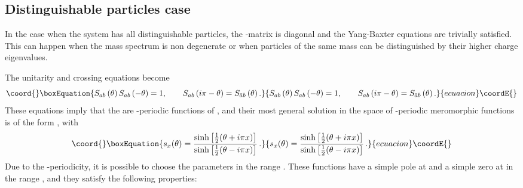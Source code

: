 \documentclass[a4paper,12pt]{report}
\begin{document}
\subsection{Distinguishable particles case} \label{sectCDD}

\vspace{0.5cm}

In the case when the system has all distinguishable particles, the \coordHE{}-matrix is diagonal and the Yang-Baxter
equations are trivially satisfied. This can happen when the mass spectrum is non degenerate or when particles of
the same mass can be distinguished by their higher charge eigenvalues.

\vspace{0.5cm}

The unitarity and crossing equations become
\begin{equation}\coord{}\boxEquation{\label{disting}
S_{ab}\left(\theta\right)S_{ab}\left(-\theta\right)=1,\qquad
S_{ab}\left(i\pi-\theta\right)=S_{\bar{a}b}\left(\theta\right).
}{S_{ab}\left(\theta\right)S_{ab}\left(-\theta\right)=1,\qquad
S_{ab}\left(i\pi-\theta\right)=S_{\bar{a}b}\left(\theta\right).
}{ecuacion}\coordE{}\end{equation}
These equations imply that the \coordHE{} are \coordHE{}-periodic functions of \myHighlight{$\theta$}\coordHE{}, and their most
general solution in the space of \coordHE{}-periodic meromorphic functions is of the form
\coordHE{}, with
\begin{equation}\coord{}\boxEquation{
s_{x}(\theta)=\frac{\sinh\left[\frac{1}{2}(\theta+i\pi x)\right]}{\sinh\left[\frac{1}{2}(\theta-i\pi x)\right]}\,.
}{
s_{x}(\theta)=\frac{\sinh\left[\frac{1}{2}(\theta+i\pi x)\right]}{\sinh\left[\frac{1}{2}(\theta-i\pi x)\right]}\,.
}{ecuacion}\coordE{}\end{equation}
Due to the \coordHE{}-periodicity, it is possible to choose the parameters \coordHE{} in the range \coordHE{}. These
functions have a simple pole at \coordHE{} and a simple zero at \coordHE{} in the range
\coordHE{}, and they satisfy the following properties:
\end{document}
